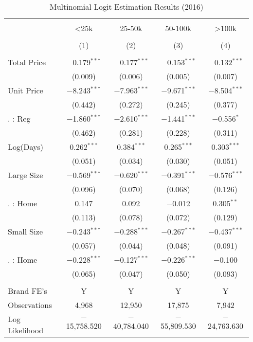 \begin{table}[!htbp] \centering
  \caption{Multinomial Logit Estimation Results (2016)}
  \label{tab:mlogit2016}
\begin{tabular}{@{\extracolsep{5pt}}lcccc}
\\[-1.8ex]\hline
\hline \\[-1.8ex]
 & <25k & 25-50k & 50-100k & >100k \\
\\[-1.8ex] & (1) & (2) & (3) & (4)\\
\hline \\[-1.8ex]
 Total Price & $-$0.179$^{***}$ & $-$0.177$^{***}$ & $-$0.153$^{***}$ & $-$0.132$^{***}$ \\
  & (0.009) & (0.006) & (0.005) & (0.007) \\
  Unit Price & $-$8.243$^{***}$ & $-$7.963$^{***}$ & $-$9.671$^{***}$ & $-$8.504$^{***}$ \\
  & (0.442) & (0.272) & (0.245) & (0.377) \\
  . : Reg & $-$1.860$^{***}$ & $-$2.610$^{***}$ & $-$1.441$^{***}$ & $-$0.556$^{*}$ \\
  & (0.462) & (0.281) & (0.228) & (0.311) \\
  Log(Days) & 0.262$^{***}$ & 0.384$^{***}$ & 0.265$^{***}$ & 0.303$^{***}$ \\
  & (0.051) & (0.034) & (0.030) & (0.051) \\
  Large Size & $-$0.569$^{***}$ & $-$0.620$^{***}$ & $-$0.391$^{***}$ & $-$0.576$^{***}$ \\
  & (0.096) & (0.070) & (0.068) & (0.126) \\
  . : Home & 0.147 & 0.092 & $-$0.012 & 0.305$^{**}$ \\
  & (0.113) & (0.078) & (0.072) & (0.129) \\
  Small Size & $-$0.243$^{***}$ & $-$0.288$^{***}$ & $-$0.267$^{***}$ & $-$0.437$^{***}$ \\
  & (0.057) & (0.044) & (0.048) & (0.091) \\
  . : Home & $-$0.228$^{***}$ & $-$0.127$^{***}$ & $-$0.226$^{***}$ & $-$0.100 \\
  & (0.065) & (0.047) & (0.050) & (0.093) \\
 \hline \\[-1.8ex]
Brand FE's & Y & Y & Y & Y \\
Observations & 4,968 & 12,950 & 17,875 & 7,942 \\
Log Likelihood & $-$15,758.520 & $-$40,784.040 & $-$55,809.530 & $-$24,763.630 \\

\end{tabular}
\end{table}
